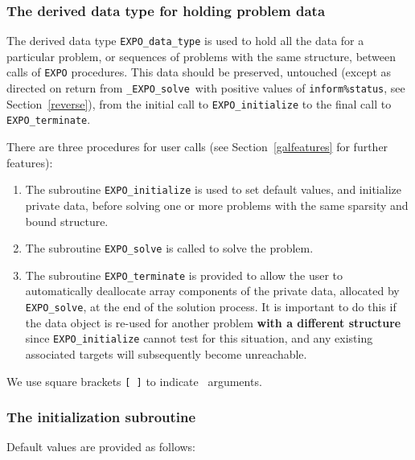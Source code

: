 \documentclass{galahad}
\newcommand{\packagename}{EXPO}
\newcommand{\fullpackagename}{\libraryname\_\packagename}
\newcommand{\solver}{{\tt \fullpackagename\_solve}}
\begin{document}

\subsubsection{The derived data type for holding problem data}\label{typedata}
The derived data type
{\tt \packagename\_data\_type}
is used to hold all the data for a particular problem,
or sequences of problems with the same structure, between calls of
{\tt \packagename} procedures.
This data should be preserved, untouched (except as directed on
return from \solver\ with positive values of {\tt inform\%status}, see
Section~\ref{reverse}),
from the initial call to
{\tt \packagename\_initialize}
to the final call to
{\tt \packagename\_terminate}.





\galarguments
There are three procedures for user calls
(see Section~\ref{galfeatures} for further features):

\begin{enumerate}
\item The subroutine
      {\tt \packagename\_initialize}
      is used to set default values, and initialize private data,
      before solving one or more problems with the
      same sparsity and bound structure.
\item The subroutine
      {\tt \packagename\_solve}
      is called to solve the problem.
\item The subroutine
      {\tt \packagename\_terminate}
      is provided to allow the user to automatically deallocate array
       components of the private data, allocated by
       {\tt \packagename\_solve},
       at the end of the solution process.
       It is important to do this if the data object is re-used for another
       problem {\bf with a different structure}
       since {\tt \packagename\_initialize} cannot test for this situation,
       and any existing associated targets will subsequently become unreachable.
\end{enumerate}
We use square brackets {\tt [ ]} to indicate \optional\ arguments.


\subsubsection{The initialization subroutine}\label{subinit}
 Default values are provided as follows:
\vspace*{1mm}
\end{document}

